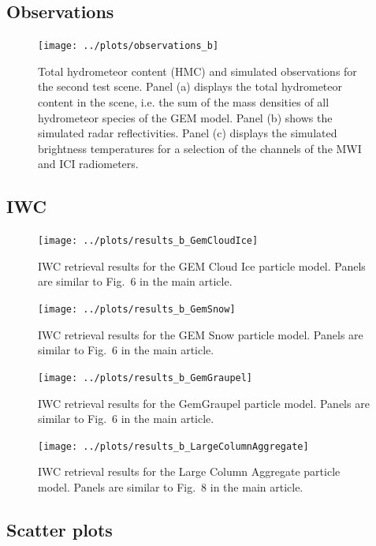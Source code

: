 \documentclass[journal abbreviation, manuscript]{copernicus}
\begin{document}
\subsection{Observations}
\begin{figure}[!hbpt]
\centering
\texttt{[image: ../plots/observations\_b]}
\caption{Total hydrometeor content (HMC) and simulated observations for the second test
  scene. Panel (a) displays the total hydrometeor content in the scene, i.e. the
  sum of the mass densities of all hydrometeor species of the GEM model. Panel
  (b) shows the simulated radar reflectivities. Panel (c) displays the simulated
  brightness temperatures for a selection of the channels of the MWI and ICI
  radiometers.}
\end{figure}

\clearpage


\subsection{IWC}

\begin{figure}[!hbpt]
\centering
\texttt{[image: ../plots/results\_b\_GemCloudIce]}
\caption{IWC retrieval results for the GEM Cloud Ice particle model. Panels
  are similar to Fig.~6 in the main article.}
\end{figure}
\clearpage

\begin{figure}[!hbpt]
\centering
\texttt{[image: ../plots/results\_b\_GemSnow]}
\caption{IWC retrieval results for the GEM Snow particle model. Panels
  are similar to Fig.~6 in the main article.}
\end{figure}
\clearpage

\begin{figure}[!hbpt]
\centering
\texttt{[image: ../plots/results\_b\_GemGraupel]}
\caption{IWC retrieval results for the GemGraupel particle model. Panels
  are similar to Fig.~6 in the main article.}
\end{figure}
\clearpage

\begin{figure}[!hbpt]
\centering
\texttt{[image: ../plots/results\_b\_LargeColumnAggregate]}
\caption{IWC retrieval results for the Large Column Aggregate particle model. Panels
  are similar to Fig.~8 in the main article.}
\end{figure}
\clearpage

\subsection{Scatter plots}
\end{document}
